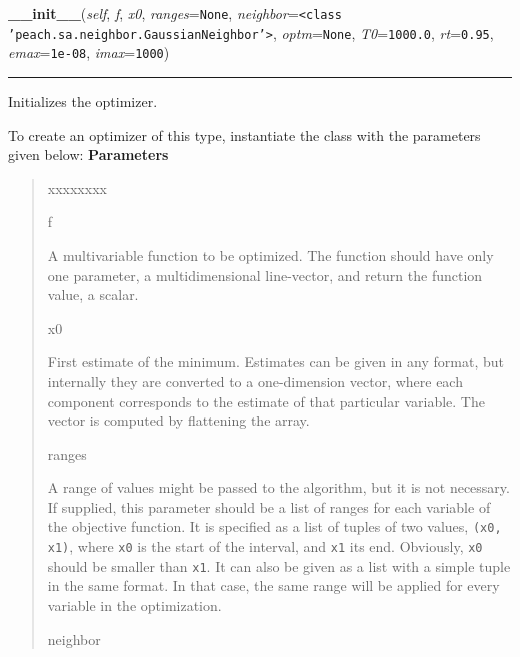 \hspace{.8\funcindent}\begin{boxedminipage}{\funcwidth}

    \raggedright \textbf{\_\_init\_\_}(\textit{self}, \textit{f}, \textit{x0}, \textit{ranges}={\tt None}, \textit{neighbor}={\tt {\textless}class 'peach.sa.neighbor.GaussianNeighbor'{\textgreater}}, \textit{optm}={\tt None}, \textit{T0}={\tt 1000.0}, \textit{rt}={\tt 0.95}, \textit{emax}={\tt 1e-08}, \textit{imax}={\tt 1000})

    \vspace{-1.5ex}

    \rule{\textwidth}{0.5\fboxrule}
\setlength{\parskip}{2ex}

Initializes the optimizer.

To create an optimizer of this type, instantiate the class with the
parameters given below:
\setlength{\parskip}{1ex}
      \textbf{Parameters}
      \vspace{-1ex}

      \begin{quote}
        \begin{Ventry}{xxxxxxxx}

          \item[f]


A multivariable function to be optimized. The function should have
only one parameter, a multidimensional line-vector, and return the
function value, a scalar.
          \item[x0]


First estimate of the minimum. Estimates can be given in any format,
but internally they are converted to a one-dimension vector, where
each component corresponds to the estimate of that particular
variable. The vector is computed by flattening the array.
          \item[ranges]


A range of values might be passed to the algorithm, but it is not
necessary. If supplied, this parameter should be a list of ranges
for each variable of the objective function. It is specified as a
list of tuples of two values, \texttt{(x0, x1)}, where \texttt{x0} is the
start of the interval, and \texttt{x1} its end. Obviously, \texttt{x0} should
be smaller than \texttt{x1}. It can also be given as a list with a simple
tuple in the same format. In that case, the same range will be
applied for every variable in the optimization.
          \item[neighbor]



\end{Ventry}
\end{quote}
\end{boxedminipage}
